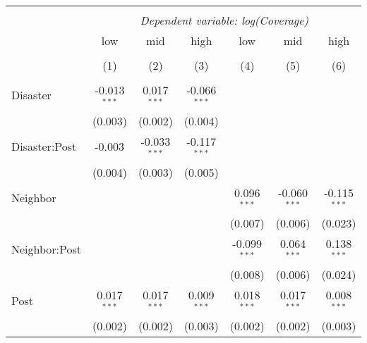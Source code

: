 
\begin{tabular}{@{\extracolsep{5pt}}lcccccc}
\\[-1.8ex]\hline
\hline \\[-1.8ex]
& \multicolumn{6}{c}{\textit{Dependent variable: log(Coverage)}} \
\cr \cline{2-7}
\\[-1.8ex] & \multicolumn{1}{c}{low} & \multicolumn{1}{c}{mid} & \multicolumn{1}{c}{high} & \multicolumn{1}{c}{low} & \multicolumn{1}{c}{mid} & \multicolumn{1}{c}{high}  \\
\\[-1.8ex] & (1) & (2) & (3) & (4) & (5) & (6) \\
\hline \\[-1.8ex]
 Disaster & -0.013$^{***}$ & 0.017$^{***}$ & -0.066$^{***}$ & & & \\
& (0.003) & (0.002) & (0.004) & & & \\
 Disaster:Post & -0.003$^{}$ & -0.033$^{***}$ & -0.117$^{***}$ & & & \\
& (0.004) & (0.003) & (0.005) & & & \\
 Neighbor & & & & 0.096$^{***}$ & -0.060$^{***}$ & -0.115$^{***}$ \\
& & & & (0.007) & (0.006) & (0.023) \\
 Neighbor:Post & & & & -0.099$^{***}$ & 0.064$^{***}$ & 0.138$^{***}$ \\
& & & & (0.008) & (0.006) & (0.024) \\
 Post & 0.017$^{***}$ & 0.017$^{***}$ & 0.009$^{***}$ & 0.018$^{***}$ & 0.017$^{***}$ & 0.008$^{***}$ \\
& (0.002) & (0.002) & (0.003) & (0.002) & (0.002) & (0.003) \\

\end{tabular}

